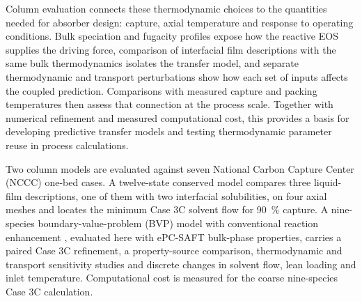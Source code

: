 Column evaluation connects these thermodynamic choices to the quantities needed for absorber design: capture, axial temperature and response to operating conditions.
Bulk speciation and fugacity profiles expose how the reactive EOS supplies the driving force, comparison of interfacial film descriptions with the same bulk thermodynamics isolates the transfer model, and separate thermodynamic and transport perturbations show how each set of inputs affects the coupled prediction.
Comparisons with measured capture and packing temperatures then assess that connection at the process scale.
Together with numerical refinement and measured computational cost, this provides a basis for developing predictive transfer models and testing thermodynamic parameter reuse in process calculations.

Two column models are evaluated against seven National Carbon Capture Center (NCCC) one-bed cases.
A twelve-state conserved model compares three liquid-film descriptions, one of them with two interfacial \COtwo{} solubilities, on four axial meshes and locates the minimum Case 3C solvent flow for \qty{90}{\percent} capture.
A nine-species boundary-value-problem (BVP) model with conventional reaction enhancement \cite{polleyReactiveEPCSAFTModeling2026}, evaluated here with ePC-SAFT bulk-phase properties, carries a paired Case 3C refinement, a property-source comparison, thermodynamic and transport sensitivity studies and discrete changes in solvent flow, lean loading and inlet temperature.
Computational cost is measured for the coarse nine-species Case 3C calculation.
